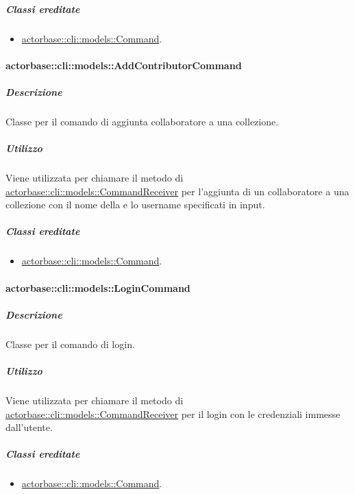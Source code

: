 \documentclass{scalatekids-article}
\begin{document}
\subparagraph{Classi ereditate}

\begin{itemize}
\item \hyperref[sec:actorbase::cli::models::Command]{actorbase::cli::models::Command}.
\end{itemize}

\paragraph{actorbase::cli::models::AddContributorCommand}
\label{sec:actorbase::cli::models::AddContributorCommand}

\subparagraph{Descrizione}

Classe per il comando di aggiunta collaboratore a una collezione.

\subparagraph{Utilizzo}

Viene utilizzata per chiamare il metodo di
\hyperref[sec:actorbase::cli::models::CommandReceiver]{actorbase::cli::models::CommandReceiver} per l'aggiunta di un collaboratore a
una collezione con il nome della  e lo username specificati
in input.

\subparagraph{Classi ereditate}

\begin{itemize}
\item \hyperref[sec:actorbase::cli::models::Command]{actorbase::cli::models::Command}.
\end{itemize}

\paragraph{actorbase::cli::models::LoginCommand}
\label{sec:actorbase::cli::models::LoginCommand}

\subparagraph{Descrizione}

Classe per il comando di login.

\subparagraph{Utilizzo}

Viene utilizzata per chiamare il metodo di
\hyperref[sec:actorbase::cli::models::CommandReceiver]{actorbase::cli::models::CommandReceiver} per il login con le credenziali
immesse dall'utente.

\subparagraph{Classi ereditate}

\begin{itemize}
\item \hyperref[sec:actorbase::cli::models::Command]{actorbase::cli::models::Command}.
\end{itemize}
\end{document}
